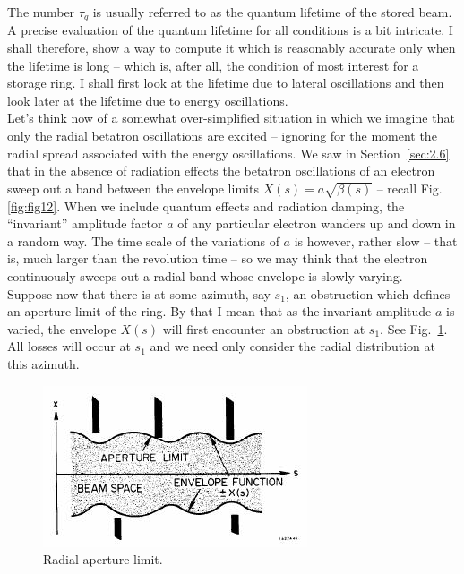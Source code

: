 The number $\tau_q$ is usually referred to as the quantum lifetime of the stored beam.\\
A precise evaluation of the quantum lifetime for all conditions is a bit intricate. I shall therefore, show a way to compute it which is reasonably accurate only when the lifetime is long -- which is, after all, the condition of most interest for a storage ring. I shall first look at the lifetime due to lateral oscillations and then look later at the lifetime due to energy oscillations.\\
Let's think now of a somewhat over-simplified situation in which we imagine that only the radial betatron oscillations are excited -- ignoring for the moment the radial spread associated with the energy oscillations. We saw in Section~\ref{sec:2.6} that in the absence of radiation effects the betatron oscillations of an electron sweep out a band between the envelope limits
 $X(s) = a\sqrt{\beta(s)}$ -- recall Fig.\ref{fig:fig12}. When we include quantum effects and radiation
 damping, the ``invariant'' amplitude factor $a$ of any particular electron wanders up and down in a random way. The time scale of the variations of $a$ is however, rather slow -- that is, much
larger than the revolution time -- so we may think that the electron continuously sweeps out a radial band whose envelope is slowly varying.\\
Suppose now that there is at some azimuth, say $s_1$, an obstruction which defines an aperture
 limit of the ring. By that I mean that as the invariant amplitude $a$ is varied, the envelope $X(s)$ will first encounter an obstruction at $s_1$. See Fig.~\ref{fig:fig46}. All losses will occur at $s_1$ and we need only consider the radial distribution at this azimuth.
\begin{figure}[!htb]
	\centering
	\includegraphics[width=0.8\linewidth]{./Figuras/fig46.jpeg}
	\caption{Radial aperture limit.}
	\label{fig:fig46}
\end{figure}
